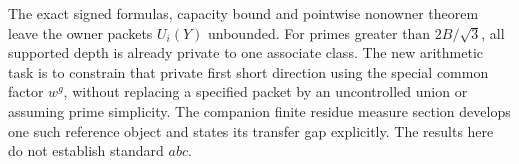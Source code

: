 The exact signed formulas, capacity bound and pointwise nonowner theorem leave
the owner packets $U_i(Y)$ unbounded. For primes greater than $2B/\sqrt3$,
all supported depth is already private to one associate class. The new
arithmetic task is to constrain that private first short direction using the
special common factor $w^g$, without replacing a specified packet by an
uncontrolled union or assuming prime simplicity. The companion finite residue
measure section develops one such reference object and states its transfer
gap explicitly. The results here do not establish standard $abc$.
